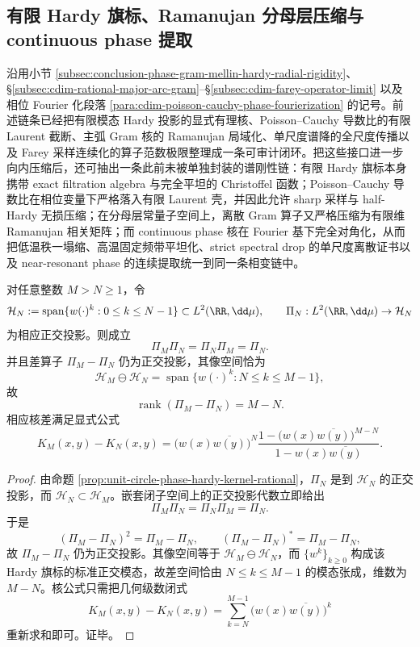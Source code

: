\subsection{有限 Hardy 旗标、Ramanujan 分母层压缩与 continuous phase 提取}\label{subsec:conclusion-hardy-filtration-ramanujan-compression-continuous-phase-extraction}
沿用小节 \ref{subsec:conclusion-phase-gram-mellin-hardy-radial-rigidity}、\S\ref{subsec:cdim-rational-major-arc-gram}--\S\ref{subsec:cdim-farey-operator-limit} 以及相位 Fourier 化段落 \ref{para:cdim-poisson-cauchy-phase-fourierization} 的记号。前述链条已经把有限模态 Hardy 投影的显式有理核、Poisson--Cauchy 导数比的有限 Laurent 截断、主弧 Gram 核的 Ramanujan 局域化、单尺度谱降的全尺度传播以及 Farey 采样连续化的算子范数极限整理成一条可审计闭环。把这些接口进一步向内压缩后，还可抽出一条此前未被单独封装的谱刚性链：有限 Hardy 旗标本身携带 exact filtration algebra 与完全平坦的 Christoffel 函数；Poisson--Cauchy 导数比在相位变量下严格落入有限 Laurent 壳，并因此允许 sharp 采样与 half-Hardy 无损压缩；在分母层常量子空间上，离散 Gram 算子又严格压缩为有限维 Ramanujan 相关矩阵；而 continuous phase 核在 Fourier 基下完全对角化，从而把低温秩一塌缩、高温固定频带平坦化、strict spectral drop 的单尺度离散证书以及 near-resonant phase 的连续提取统一到同一条相变链中。

\begin{theorem}\label{thm:conclusion-hardy-filtration-exact-projection-algebra}
对任意整数 \(M>N\ge 1\)，令
\[
\mathcal H_N:=\operatorname{span}\{w(\cdot)^k:0\le k\le N-1\}\subset L^2(\RR,\dd\mu),
\qquad
\Pi_N:L^2(\RR,\dd\mu)\to \mathcal H_N
\]
为相应正交投影。则成立
\[
\Pi_M\Pi_N=\Pi_N\Pi_M=\Pi_N.
\]
并且差算子 \(\Pi_M-\Pi_N\) 仍为正交投影，其像空间恰为
\[
\mathcal H_M\ominus \mathcal H_N
=
\operatorname{span}\{w(\cdot)^k:N\le k\le M-1\},
\]
故
\[
\operatorname{rank}(\Pi_M-\Pi_N)=M-N.
\]
相应核差满足显式公式
\[
K_M(x,y)-K_N(x,y)
=
\bigl(w(x)\overline{w(y)}\bigr)^N
\frac{1-\bigl(w(x)\overline{w(y)}\bigr)^{M-N}}{1-w(x)\overline{w(y)}}.
\]
\end{theorem}
\begin{proof}
由命题 \ref{prop:unit-circle-phase-hardy-kernel-rational}，\(\Pi_N\) 是到 \(\mathcal H_N\) 的正交投影，而 \(\mathcal H_N\subset\mathcal H_M\)。嵌套闭子空间上的正交投影代数立即给出
\[
\Pi_M\Pi_N=\Pi_N\Pi_M=\Pi_N.
\]
于是
\[
(\Pi_M-\Pi_N)^2=\Pi_M-\Pi_N,
\qquad
(\Pi_M-\Pi_N)^\ast=\Pi_M-\Pi_N,
\]
故 \(\Pi_M-\Pi_N\) 仍为正交投影。其像空间等于 \(\mathcal H_M\ominus\mathcal H_N\)，而 \(\{w^k\}_{k\ge 0}\) 构成该 Hardy 旗标的标准正交模态，故差空间恰由 \(N\le k\le M-1\) 的模态张成，维数为 \(M-N\)。核公式只需把几何级数闭式
\[
K_M(x,y)-K_N(x,y)=\sum_{k=N}^{M-1}\bigl(w(x)\overline{w(y)}\bigr)^k
\]
重新求和即可。证毕。
\end{proof}

